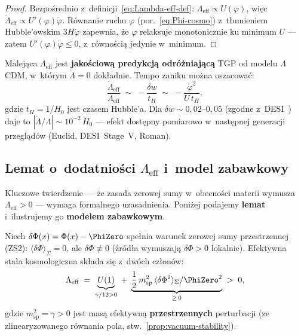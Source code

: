 \begin{proof}
Bezpo\'srednio z~definicji~\eqref{eq:Lambda-eff-def}:
$\Lambda_{\mathrm{eff}} \propto U(\varphi)$, wi\k{e}c
$\dot{\Lambda}_{\mathrm{eff}} \propto U'(\varphi)\dot{\varphi}$.
R\'ownanie ruchu $\varphi$ (por.~\eqref{eq:Phi-cosmo})
z~t\l{}umieniem Hubble'owskim $3H\dot{\varphi}$ zapewnia,
\.ze $\varphi$ relaksuje monotonicznie ku minimum $U$ ---
zatem $U'(\varphi)\dot{\varphi} \leq 0$, z~r\'owno\'sci\k{a}
jedynie w~minimum.
\end{proof}

\begin{remark}\label{rem:Lambda-test}
Malej\k{a}ca $\Lambda_{\mathrm{eff}}$ jest \textbf{jako\'sciow\k{a}
predykcj\k{a} odr\'o\.zniaj\k{a}c\k{a}} TGP od modelu $\Lambda$CDM,
w~kt\'orym $\dot{\Lambda} = 0$ dok\l{}adnie.
Tempo zaniku mo\.zna oszacowa\'c:
\begin{equation}\label{eq:Lambda-rate}
    \frac{\dot{\Lambda}_{\mathrm{eff}}}{\Lambda_{\mathrm{eff}}}
    \;\sim\; -\frac{\delta w}{t_H}
    \;\sim\; -\frac{\dot{\varphi}^2}{U\,t_H},
\end{equation}
gdzie $t_H = 1/H_0$ jest czasem Hubble'a. Dla $\delta w
\sim 0{,}02$--$0{,}05$ (zgodne z~DESI~\cite{DESI2024}) daje to
$|\dot{\Lambda}/\Lambda| \sim 10^{-2}\,H_0$ --- efekt
dost\k{e}pny pomiarowo w~nast\k{e}pnej generacji przegl\k{a}d\'ow
(Euclid, DESI~Stage~V, Roman).
\end{remark}

\subsection{Lemat o~dodatniości $\Lambda_{\mathrm{eff}}$
  i~model zabawkowy}\label{ssec:de-lemat}

Kluczowe twierdzenie --- \.ze zasada zerowej sumy
w~obecno\'sci materii wymusza $\Lambda_{\mathrm{eff}} > 0$ ---
wymaga formalnego uzasadnienia. Poni\.zej podajemy
\textbf{lemat} i~ilustrujemy go \textbf{modelem zabawkowym}.

\begin{lemma}\label{lem:Lambda-positive}
Niech $\delta\Phi(x) = \Phi(x) - \PhiZero$ spe\l{}nia warunek zerowej sumy
przestrzennej (ZS2): $\langle\delta\Phi\rangle_\Sigma = 0$,
ale $\delta\Phi \not\equiv 0$ (\'zr\'od\l{}a wymuszaj\k{a}
$\delta\Phi > 0$ lokalnie).
Efektywna sta\l{}a kosmologiczna sk\l{}ada si\k{e} z~dw\'och
cz\l{}on\'ow:
\begin{equation}\label{eq:Lambda-pos-lem}
  \Lambda_{\mathrm{eff}}
  \;=\; \underbrace{U(1)}_{\gamma/12 > 0}
  \;+\; \underbrace{\frac{1}{2}\,m_{\mathrm{sp}}^2\,
  \langle\delta\Phi^2\rangle_\Sigma /\PhiZero^2}_{\geq\, 0}
  \;>\; 0,
\end{equation}
gdzie $m_{\mathrm{sp}}^2 = \gamma > 0$ jest mas\k{a} efektywn\k{a}
\textbf{przestrzennych} perturbacji (ze zlinearyzowanego
r\'ownania pola, stw.~\ref{prop:vacuum-stability}).
\end{lemma}

